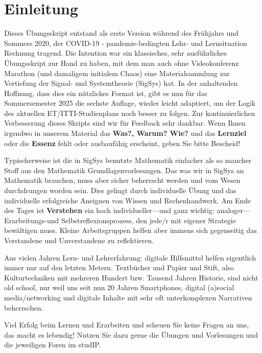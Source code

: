 \newpage
\section*{Einleitung}
%

Dieses Übungsskript entstand als erste Version während des Frühjahrs und Sommers 2020, der
COVID-19 - pandemie-bedingten Lehr- und Lernsituation Rechnung tragend.
%
Die Intention war ein klassisches, sehr ausführliches Übungsskript zur Hand zu haben,
mit dem man auch ohne Videokonferenz Marathon (und damaligem initialem Chaos)
eine Materialsammlung zur Vertiefung der Signal- und Systemtheorie (SigSys)
hat.
%
In der anhaltenden Hoffnung, dass dies ein nützliches Format ist, gibt es nun
für das Sommersemester 2025 die sechste Auflage, wieder leicht adaptiert,
um der Logik des aktuellen ET/ITTI-Studienplans noch besser zu folgen.
%
Zur kontinuierlichen Verbesserung dieses Skripts sind wir für Feedback sehr dankbar.
%
Wenn Ihnen irgendwo in unserem Material das \textbf{Was?, Warum? Wie?} und das
\textbf{Lernziel} oder die \textbf{Essenz} fehlt oder ausbaufähig erscheint, geben Sie bitte Bescheid!

Typischerweise ist die in SigSys benutzte Mathematik einfacher als so mancher
Stoff aus den Mathematik Grundlagenvorlesungen.
%
Das was wir in SigSys an Mathematik brauchen, muss aber sicher beherrscht werden
und vom Wesen durchdrungen worden sein.
%
Dies gelingt durch individuelle Übung und das individuelle erfolgreiche Aneignen
von Wissen und Rechenhandwerk.
%
Am Ende des Tages ist \textbf{Verstehen} ein hoch individueller---und ganz wichtig: analoger---
Erarbeitungs-und Selbstreflexionsprozess, den jede/r mit eigener Strategie bewältigen muss.
%
Kleine Arbeitsgruppen helfen aber immens sich gegenseitig das Verstandene und
Unverstandene zu reflektieren.

Aus vielen Jahren Lern- und Lehrerfahrung: digitale Hilfsmittel helfen eigentlich immer nur auf den letzten Metern. Textbücher und Papier und Stift, also Kulturtechniken mit mehreren Hundert bzw. Tausend Jahren Historie, sind nicht old school, nur weil uns seit nun 20 Jahren Smartphones, digital (a)social media/networking und digitale Inhalte mit sehr oft unterkomplexen Narrativen beherrschen.

Viel Erfolg beim Lernen und Erarbeiten und scheuen Sie keine Fragen an uns, das macht es lebendig!
Nutzen Sie dazu gerne die Übungen und Vorlesungen und die
jeweiligen Foren im studIP.
%


